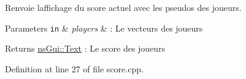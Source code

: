 Renvoie l\textquotesingle{}affichage du score actuel avec les pseudos des joueurs. 


\begin{DoxyParams}[1]{Parameters}
\mbox{\tt in}  & {\em players} & \+: Le vecteurs des joueurs \\
\hline
\end{DoxyParams}
\begin{DoxyReturn}{Returns}
\hyperlink{classns_gui_1_1_text}{ns\+Gui\+::\+Text} \+: Le score des joueurs 
\end{DoxyReturn}


Definition at line 27 of file score.\+cpp.

